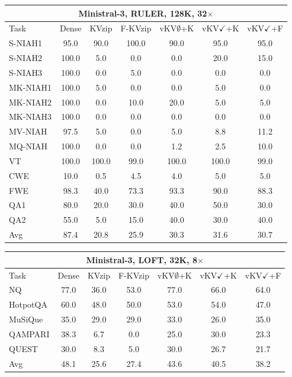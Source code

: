 \begin{tabular}{lcccccc}
\toprule
\multicolumn{7}{c}{Ministral-3, RULER, 128K, 32$\times$} \\
\midrule
Task & Dense & KVzip & F-KVzip & vKV$\emptyset$+K & vKV$\checkmark$+K & vKV$\checkmark$+F \\
\midrule
S-NIAH1 & 95.0 & 90.0 & 100.0 & 90.0 & 95.0 & 95.0 \\
S-NIAH2 & 100.0 & 5.0 & 0.0 & 0.0 & 20.0 & 15.0 \\
S-NIAH3 & 100.0 & 0.0 & 5.0 & 0.0 & 0.0 & 0.0 \\
MK-NIAH1 & 100.0 & 5.0 & 0.0 & 0.0 & 5.0 & 0.0 \\
MK-NIAH2 & 100.0 & 0.0 & 10.0 & 20.0 & 5.0 & 5.0 \\
MK-NIAH3 & 100.0 & 0.0 & 0.0 & 0.0 & 0.0 & 0.0 \\
MV-NIAH & 97.5 & 5.0 & 0.0 & 5.0 & 8.8 & 11.2 \\
MQ-NIAH & 100.0 & 0.0 & 0.0 & 1.2 & 2.5 & 10.0 \\
VT & 100.0 & 100.0 & 99.0 & 100.0 & 100.0 & 99.0 \\
CWE & 10.0 & 0.5 & 4.5 & 4.0 & 5.0 & 5.0 \\
FWE & 98.3 & 40.0 & 73.3 & 93.3 & 90.0 & 88.3 \\
QA1 & 80.0 & 20.0 & 30.0 & 40.0 & 50.0 & 30.0 \\
QA2 & 55.0 & 5.0 & 15.0 & 40.0 & 30.0 & 40.0 \\
\midrule
Avg & 87.4 & 20.8 & 25.9 & 30.3 & 31.6 & 30.7 \\
\bottomrule
\end{tabular}
\vspace{0.8em}

\begin{tabular}{lcccccc}
\toprule
\multicolumn{7}{c}{Ministral-3, LOFT, 32K, 8$\times$} \\
\midrule
Task & Dense & KVzip & F-KVzip & vKV$\emptyset$+K & vKV$\checkmark$+K & vKV$\checkmark$+F \\
\midrule
NQ & 77.0 & 36.0 & 53.0 & 77.0 & 66.0 & 64.0 \\
HotpotQA & 60.0 & 48.0 & 50.0 & 53.0 & 54.0 & 47.0 \\
MuSiQue & 35.0 & 29.0 & 29.0 & 33.0 & 26.0 & 35.0 \\
QAMPARI & 38.3 & 6.7 & 0.0 & 25.0 & 30.0 & 23.3 \\
QUEST & 30.0 & 8.3 & 5.0 & 30.0 & 26.7 & 21.7 \\
\midrule
Avg & 48.1 & 25.6 & 27.4 & 43.6 & 40.5 & 38.2 \\
\bottomrule
\end{tabular}
\vspace{0.8em}

